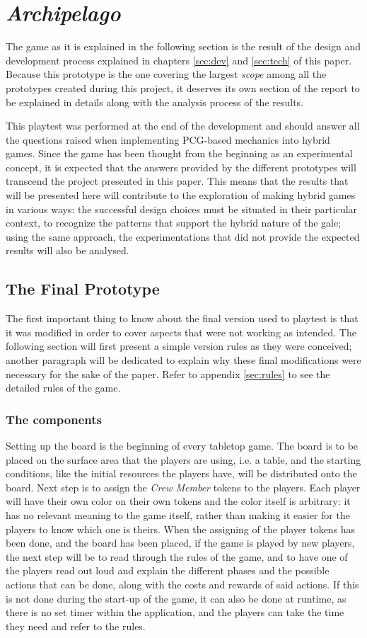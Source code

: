 \chapter{\textit{Archipelago}}
The game as it is explained in the following section is the result of the design and development process explained in chapters \ref{sec:dev} and \ref{sec:tech} of this paper. Because this prototype is the one covering the largest \textit{scope} among all the prototypes created during this project, it deserves its own section of the report to be explained in details along with the analysis process of the results.
 
This playtest was performed at the end of the development and should answer all the questions raised when implementing PCG-based mechanics into hybrid games. Since the game has been thought from the beginning as an experimental concept, it is expected that the answers provided by the different prototypes will transcend the project presented in this paper. This means that the results that will be presented here will contribute to the exploration of making hybrid games in various ways: the successful design choices must be situated in their particular context, to recognize the patterns that support the hybrid nature of the gale; using the same approach, the experimentations that did not provide the expected results will also be analysed.
\section{The Final Prototype}
\label{sec:finalproto}
The first important thing to know about the final version used to playtest is that it was modified in order to cover aspects that were not working as intended. The following section will first present a simple version rules as they were conceived; another paragraph will be dedicated to explain why these final modifications were necessary for the sake of the paper. Refer to appendix \ref{sec:rules} to see the detailed rules of the game.

\subsection{The components}
Setting up the board is the beginning of every tabletop game. The board is to be placed on the surface area that the players are using, i.e. a table, and the starting conditions, like the initial resources the players have, will be distributed onto the board. Next step is to assign the \textit{Crew Member} tokens to the players. Each player will have their own color on their own tokens and the color itself is arbitrary: it has no relevant meaning to the game itself, rather than making it easier for the players to know which one is theirs.
When the assigning of the player tokens has been done, and the board has been placed, if the game is played by new players, the next step will be to read through the rules of the game, and to have one of the players read out loud and explain the different phases and the possible actions that can be done, along with the costs and rewards of said actions. If this is not done during the start-up of the game, it can also be done at runtime, as there is no set timer within the application, and the players can take the time they need and refer to the rules.
